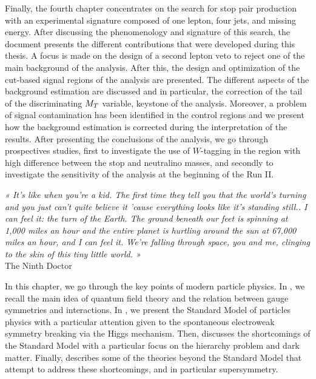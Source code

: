 Finally, the fourth chapter concentrates on the search for stop pair production
with an experimental signature composed of one lepton, four jets, and missing
energy. After discussing the phenomenology and signature of this search, the
document presents the different contributions that were developed during this
thesis.  A focus is made on the design of a second lepton veto to reject one of
the main background of the analysis. After this, the design and optimization of
the cut-based signal regions of the analysis are presented. The different
aspects of the background estimation are discussed and in particular, the
correction of the tail of the discriminating $M_T$ variable, keystone of the
analysis. Moreover, a problem of signal contamination has been identified in the
control regions and we present how the background estimation is corrected during
the interpretation of the results. After presenting the conclusions of the
analysis, we go through prospectives studies, first to investigate the use of
$W$-tagging in the region with high difference between the stop and neutralino
masses, and secondly to investigate the sensitivity of the analysis at the
beginning of the Run II.

\setcounter{mtc}{2}
\vspace*{-0.7cm}
\begin{center}
\begin{minipage}{0.95\textwidth}
\emph{« It’s like when you’re a kid. The first time they tell you that the world’s turning
and you just can’t quite believe it ’cause everything looks like it’s standing still.. I
can feel it: the turn of the Earth. The ground beneath our feet is spinning at 1,000 miles
an hour and the entire planet is hurtling around the sun at 67,000 miles an hour, and I
can feel it. We’re falling through space, you and me, clinging to the skin of this tiny
little world. »}\\
\hspace*{0.75\textwidth} The Ninth Doctor
\end{minipage}
\end{center}
\minitoc
\newpage

    In this chapter, we go through the key points of modern particle physics. In
    , we recall the main idea of quantum
    field theory and the relation between gauge symmetries and interactions. In
    , we present the Standard Model of particles
    physics with a particular attention given to the spontaneous electroweak
    symmetry breaking via the Higgs mechanism. Then,
     discusses the shortcomings of the
    Standard Model with a particular focus on the hierarchy problem and dark
    matter. Finally,  describes some of
    the theories beyond the Standard Model that attempt to address these
    shortcomings, and in particular supersymmetry.


